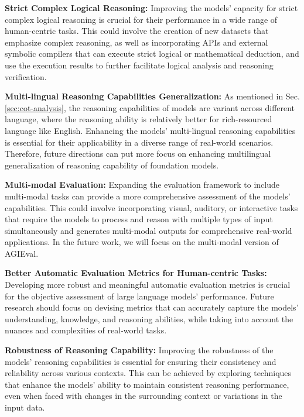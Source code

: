 \par{\textbf{Strict Complex Logical Reasoning:}} Improving the models' capacity for strict complex logical reasoning is crucial for their performance in a wide range of human-centric tasks. This could involve the creation of new datasets that emphasize complex reasoning, as well as incorporating APIs and external symbolic compilers that can execute strict logical or mathematical deduction, and use the execution results to further facilitate logical analysis and reasoning verification.

\par{\textbf{Multi-lingual Reasoning Capabilities Generalization:}} As mentioned in Sec. \ref{sec:cot-analysis}, the reasoning capabilities of models are variant across different language, where the reasoning ability is relatively better for rich-resourced language like English. Enhancing the models' multi-lingual reasoning capabilities is essential for their applicability in a diverse range of real-world scenarios. Therefore, future directions can put more focus on enhancing multilingual generalization of reasoning capability of foundation models. 
\par{\textbf{Multi-modal Evaluation:}} Expanding the evaluation framework to include multi-modal tasks can provide a more comprehensive assessment of the models' capabilities. This could involve incorporating visual, auditory, or interactive tasks that require the models to process and reason with multiple types of input simultaneously and generates multi-modal outputs for comprehensive real-world applications. In the future work, we will focus on the multi-modal version of {AGIEval}.
\par{\textbf{Better Automatic Evaluation Metrics for Human-centric Tasks:}} Developing more robust and meaningful automatic evaluation metrics is crucial for the objective assessment of large language models' performance. Future research should focus on devising metrics that can accurately capture the models' understanding, knowledge, and reasoning abilities, while taking into account the nuances and complexities of real-world tasks.

\par{\textbf{Robustness of Reasoning Capability:}} Improving the robustness of the models' reasoning capabilities is essential for ensuring their consistency and reliability across various contexts. This can be achieved by exploring techniques that enhance the models' ability to maintain consistent reasoning performance, even when faced with changes in the surrounding context or variations in the input data.


